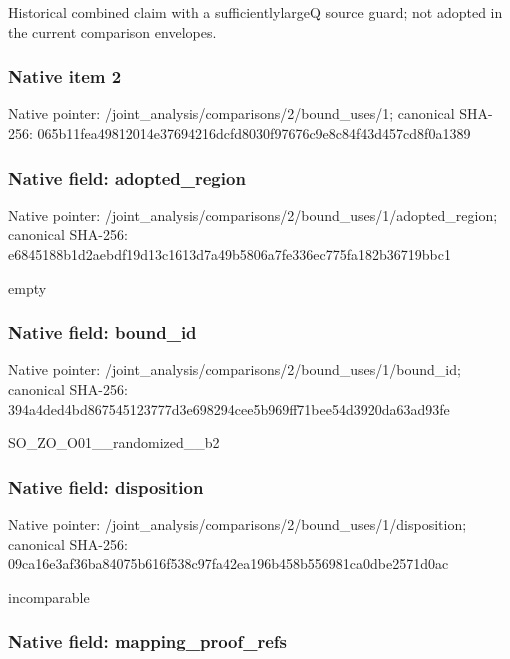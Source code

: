 \documentclass[10pt,a4paper]{article}
\begin{document}
Historical combined claim with a sufficientlylargeQ source guard; not adopted in the current comparison envelopes.


\subsubsection{Native item 2}


Native pointer: /joint\_analysis/comparis\allowbreak{}ons/2/bound\_uses/1; canonical SHA-256: 065b11fea49812014e376942\allowbreak{}16dcfd8030f97676c9e8c84f\allowbreak{}43d457cd8f0a1389



\subsubsection{Native field: adopted\_region}


Native pointer: /joint\_analysis/comparis\allowbreak{}ons/2/bound\_uses/1/adopt\allowbreak{}ed\_region; canonical SHA-256: e6845188b1d2aebdf19d13c1\allowbreak{}613d7a49b5806a7fe336ec77\allowbreak{}5fa182b36719bbc1


empty


\subsubsection{Native field: bound\_id}


Native pointer: /joint\_analysis/comparis\allowbreak{}ons/2/bound\_uses/1/bound\allowbreak{}\_id; canonical SHA-256: 394a4ded4bd867545123777d\allowbreak{}3e698294cee5b969ff71bee5\allowbreak{}4d3920da63ad93fe


SO\_ZO\_O01\_\_randomized\_\_b2


\subsubsection{Native field: disposition}


Native pointer: /joint\_analysis/comparis\allowbreak{}ons/2/bound\_uses/1/dispo\allowbreak{}sition; canonical SHA-256: 09ca16e3af36ba84075b616f\allowbreak{}538c97fa42ea196b458b5569\allowbreak{}81ca0dbe2571d0ac


incomparable


\subsubsection{Native field: mapping\_proof\_refs}
\end{document}
